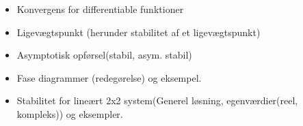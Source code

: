 \begin{itemize}
    \item Konvergens for differentiable funktioner
    \item Ligevægtspunkt (herunder stabilitet af et ligevægtspunkt)
    \item Asymptotisk opførsel(stabil, asym. stabil)
    \item Fase diagrammer (redegørelse) og eksempel.
    \item Stabilitet for lineært 2x2 system(Generel løsning, egenværdier(reel, kompleks)) og eksempler.
\end{itemize}














